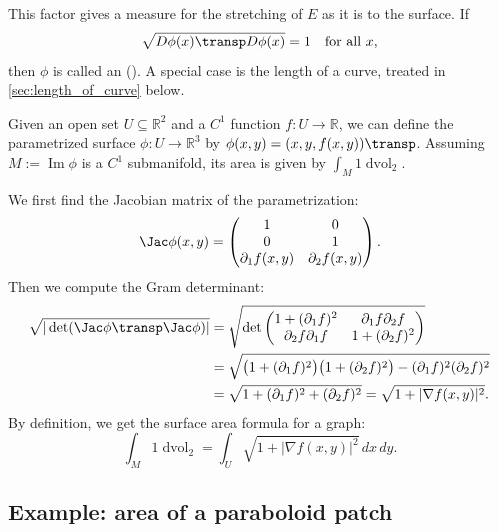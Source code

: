 This factor gives a measure for the stretching of $E$ as it is  to the surface. If
\[\sqrt{D\phi(x)\transp D\phi(x)} = 1 \quad \text{for all } x,\]
then $\phi$ is called an  (). A special case is the
length of a curve, treated in \cref{sec:length_of_curve} below.

\begin{example}
\label{ex:integral_graph_function}
Given an open set $U \subseteq \mathbb{R}^2$ and a $C^1$ function $f: U \to \mathbb{R}$, we can define the parametrized surface $\phi: U \to \mathbb{R}^3$ by $\phi(x,y) = (x,y,f(x,y))\transp$.
Assuming $M := \operatorname{Im}\phi$ is a $C^1$ submanifold, its area is given by $\int_M 1 \mathop{d\text{vol}}_2$.

We first find the Jacobian matrix of the parametrization:
\[\Jac\phi(x,y) = \begin{pmatrix} 1 & 0 \\ 0 & 1 \\ \partial_1 f(x,y) & \partial_2 f(x,y) \end{pmatrix}.\]
Then we compute the Gram determinant:
\begin{align*}
\sqrt{|\det(\Jac\phi\transp \Jac\phi)|}
&= \sqrt{\det \begin{pmatrix} 1+(\partial_1 f)^2 & \partial_1 f \partial_2 f \\ \partial_2 f \partial_1 f & 1+(\partial_2 f)^2 \end{pmatrix}} \\
&= \sqrt{\big(1+(\partial_1 f)^2\big)\big(1+(\partial_2 f)^2\big) - (\partial_1 f)^2(\partial_2 f)^2} \\
&= \sqrt{1 + (\partial_1 f)^2 + (\partial_2 f)^2} = \sqrt{1+|\nabla f(x,y)|^2}.
\end{align*}
By definition, we get the surface area formula for a graph:
\[\int_M 1 \mathop{d\text{vol}}_2 = \int_U \sqrt{1+|\nabla f(x,y)|^2} \,dx\,dy.\]
\end{example}

\subsection{Example: area of a paraboloid patch}
\label{sec:example_paraboloid_area}

